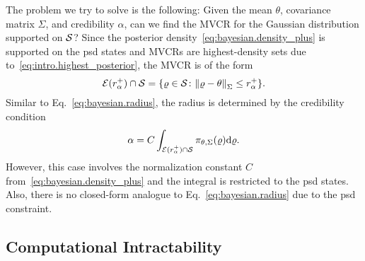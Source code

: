 The problem we try to solve is the following:
Given the mean $\theta$, covariance matrix $\Sigma$, and credibility $\alpha$, can we find the MVCR for the Gaussian distribution supported on $\mathcal{S}$?
Since the posterior density~\eqref{eq:bayesian.density_plus} is supported on the psd states and MVCRs are highest-density sets due to~\eqref{eq:intro.highest_posterior}, the MVCR is of the form
\begin{equation}
  \mathcal{E}(r^+_{\alpha}) \cap \mathcal{S} = \{ \varrho \in \mathcal{S} \colon {\Vert\varrho - \theta\Vert}_\Sigma \le r^+_{\alpha} \}.
  \label{eq:bayesian.mvcr}
\end{equation}
Similar to Eq.~\eqref{eq:bayesian.radius}, the radius is determined by the credibility condition
\begin{equation}
  \label{eq:bayesian.radius_plus}
  \alpha = C \int_{\mathcal{E}(r^+_{\alpha}) \cap \mathcal{S}} \pi_{\theta,\Sigma}(\varrho) \mathrm{d} \varrho.
\end{equation}
However, this case involves the normalization constant $C$ from~\eqref{eq:bayesian.density_plus} and the integral is restricted to the psd states.
Also, there is no closed-form analogue to Eq.~\eqref{eq:bayesian.radius} due to the psd constraint.

\subsection{Computational Intractability}
\label{sub:bayesian.hard}






